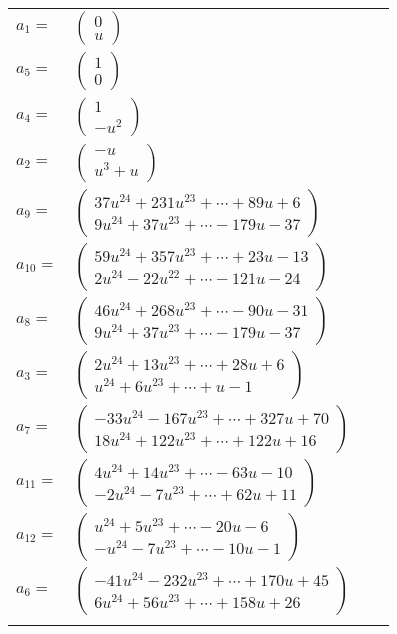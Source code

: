 \documentclass[1p]{elsarticle_modified}
\theoremstyle{definition}
\begin{document}
\begin{tabular}{m{7pt} m{180pt} m{7pt} m{180pt} }
\flushright $a_{1}=$&$\begin{pmatrix}0\\u\end{pmatrix}$ \\
\flushright $a_{5}=$&$\begin{pmatrix}1\\0\end{pmatrix}$ \\
\flushright $a_{4}=$&$\begin{pmatrix}1\\- u^2\end{pmatrix}$ \\
\flushright $a_{2}=$&$\begin{pmatrix}- u\\u^3+u\end{pmatrix}$ \\
\flushright $a_{9}=$&$\begin{pmatrix}37 u^{24}+231 u^{23}+\cdots+89 u+6\\9 u^{24}+37 u^{23}+\cdots-179 u-37\end{pmatrix}$ \\
\flushright $a_{10}=$&$\begin{pmatrix}59 u^{24}+357 u^{23}+\cdots+23 u-13\\2 u^{24}-22 u^{22}+\cdots-121 u-24\end{pmatrix}$ \\
\flushright $a_{8}=$&$\begin{pmatrix}46 u^{24}+268 u^{23}+\cdots-90 u-31\\9 u^{24}+37 u^{23}+\cdots-179 u-37\end{pmatrix}$ \\
\flushright $a_{3}=$&$\begin{pmatrix}2 u^{24}+13 u^{23}+\cdots+28 u+6\\u^{24}+6 u^{23}+\cdots+u-1\end{pmatrix}$ \\
\flushright $a_{7}=$&$\begin{pmatrix}-33 u^{24}-167 u^{23}+\cdots+327 u+70\\18 u^{24}+122 u^{23}+\cdots+122 u+16\end{pmatrix}$ \\
\flushright $a_{11}=$&$\begin{pmatrix}4 u^{24}+14 u^{23}+\cdots-63 u-10\\-2 u^{24}-7 u^{23}+\cdots+62 u+11\end{pmatrix}$ \\
\flushright $a_{12}=$&$\begin{pmatrix}u^{24}+5 u^{23}+\cdots-20 u-6\\- u^{24}-7 u^{23}+\cdots-10 u-1\end{pmatrix}$ \\
\flushright $a_{6}=$&$\begin{pmatrix}-41 u^{24}-232 u^{23}+\cdots+170 u+45\\6 u^{24}+56 u^{23}+\cdots+158 u+26\end{pmatrix}$\\&\end{tabular}
\end{document}
